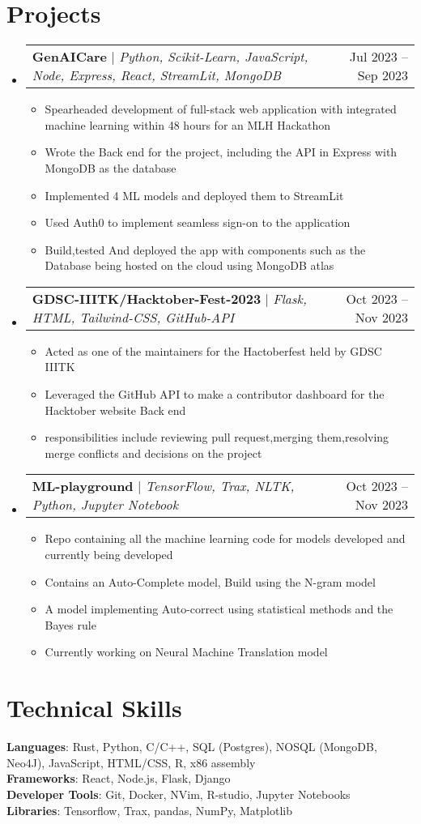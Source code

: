 \documentclass[letterpaper,11pt]{article}
\makeatletter
\newcommand{\resumeItem}[1]{
  \item\small{
    {#1 \vspace{-2pt}}
  }
}
\newcommand{\resumeProjectHeading}[2]{
    \item
    \begin{tabular*}{0.97\textwidth}{l@{\extracolsep{\fill}}r}
      \small#1 & #2 \\
    \end{tabular*}\vspace{-7pt}
}
\newcommand{\resumeSubHeadingListStart}{\begin{itemize}[leftmargin=0.15in, label={}]}
\newcommand{\resumeSubHeadingListEnd}{\end{itemize}}
\newcommand{\resumeItemListStart}{\begin{itemize}}
\newcommand{\resumeItemListEnd}{\end{itemize}\vspace{-5pt}}
\makeatother
\begin{document}
\section{Projects}
    \resumeSubHeadingListStart
    
      \resumeProjectHeading
          {\textbf{GenAICare} $|$ \emph{Python, Scikit-Learn, JavaScript, Node, Express, React, StreamLit, MongoDB }}{Jul 2023 -- Sep 2023}
          \resumeItemListStart
            \resumeItem{Spearheaded development of full-stack web application with integrated machine learning within 48 hours for an MLH Hackathon}
            \resumeItem{Wrote the Back end for the project, including the API in Express with MongoDB as the database  }
            \resumeItem{ Implemented 4 ML models and deployed them to StreamLit}
            \resumeItem{Used Auth0 to implement seamless sign-on to the application  }
            \resumeItem{Build,tested And deployed the app with components such as the Database being hosted on the cloud using MongoDB atlas}
          \resumeItemListEnd
          
      \resumeProjectHeading
          {\textbf{GDSC-IIITK/Hacktober-Fest-2023} $|$ \emph{Flask, HTML, Tailwind-CSS, GitHub-API}}{Oct 2023 -- Nov 2023}
          \resumeItemListStart
            \resumeItem{Acted as one of the maintainers for the Hactoberfest held by GDSC IIITK }
            \resumeItem{Leveraged the GitHub API to make a contributor dashboard for the Hacktober website Back end}
            \resumeItem{responsibilities include reviewing pull request,merging them,resolving merge conflicts and decisions on the project}
          \resumeItemListEnd
          
        \resumeProjectHeading
          {\textbf{ML-playground} $|$ \emph{TensorFlow, Trax, NLTK, Python, Jupyter Notebook}}{Oct 2023 -- Nov 2023}
          \resumeItemListStart
            \resumeItem{ Repo containing all the machine learning code for models developed and currently being developed }
            \resumeItem{Contains an Auto-Complete model, Build using the N-gram model}
            \resumeItem{A model implementing Auto-correct using statistical methods and the Bayes rule }
            \resumeItem{Currently working on Neural Machine Translation model }
          \resumeItemListEnd
    \resumeSubHeadingListEnd


\section{Technical Skills}
 \begin{itemize}[leftmargin=0.15in, label={}]
    \small{\item{
     \textbf{Languages}{: Rust, Python, C/C++, SQL (Postgres), NOSQL (MongoDB, Neo4J), JavaScript, HTML/CSS, R, x86 assembly} \\
     \textbf{Frameworks}{: React, Node.js, Flask, Django} \\
     \textbf{Developer Tools}{: Git, Docker, NVim, R-studio, Jupyter Notebooks } \\
     \textbf{Libraries}{: Tensorflow, Trax, pandas, NumPy, Matplotlib}
    }}
 \end{itemize}
\end{document}
